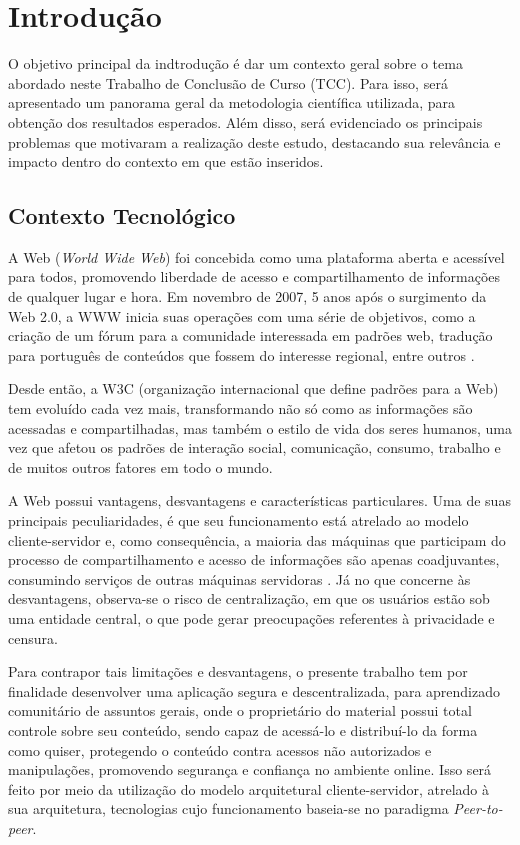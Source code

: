 \chapter[Introdução]{Introdução}
\label{cap:introducao}

O objetivo principal da indtrodução é dar um contexto geral sobre o tema abordado neste Trabalho de Conclusão de Curso (TCC). Para isso, será apresentado um panorama geral da metodologia científica utilizada, para obtenção dos resultados esperados. Além disso, será evidenciado os principais problemas que motivaram a realização deste estudo, destacando sua relevância e impacto dentro do contexto em que estão inseridos. 

\section{Contexto Tecnológico}

A Web (\textit{World Wide Web}) foi concebida como uma plataforma aberta e acessível para todos, promovendo liberdade de acesso e compartilhamento de informações de qualquer lugar e hora. Em novembro de 2007, 5 anos após o surgimento da Web 2.0, a WWW inicia suas operações com uma série de objetivos, como a criação de um fórum para a comunidade interessada em padrões web, tradução para português de conteúdos que fossem do interesse regional, entre outros \cite{vieira2014}.

Desde então, a W3C (organização internacional que define padrões para a Web) tem evoluído cada vez mais, transformando não só como as informações são acessadas e compartilhadas, mas também o estilo de vida dos seres humanos, uma vez que afetou os padrões de interação social, comunicação, consumo, trabalho e de muitos outros fatores em todo o mundo.

A Web possui vantagens, desvantagens e características particulares. Uma de suas principais peculiaridades, é que seu funcionamento está atrelado ao modelo cliente-servidor e, como consequência, a maioria das máquinas que participam do processo de compartilhamento e acesso de informações são apenas coadjuvantes, consumindo serviços de outras máquinas servidoras \cite{rocha2004p2p}. Já no que concerne às desvantagens, observa-se o risco de centralização, em que os usuários estão sob uma entidade central, o que pode gerar preocupações referentes à privacidade e censura. 

Para contrapor tais limitações e desvantagens, o presente trabalho tem por finalidade desenvolver uma aplicação segura e descentralizada, para aprendizado comunitário de assuntos gerais, onde o proprietário do material possui total controle sobre seu conteúdo, sendo capaz de acessá-lo e distribuí-lo da forma como quiser, protegendo o conteúdo contra acessos não autorizados e manipulações, promovendo segurança e confiança no ambiente online. Isso será feito por meio da utilização do modelo arquitetural cliente-servidor, atrelado à sua arquitetura, tecnologias cujo funcionamento baseia-se no paradigma \textit{Peer-to-peer}.

